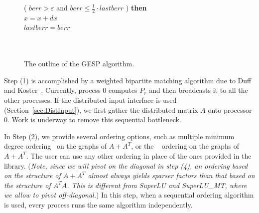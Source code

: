 {\begin{figure}
\begin{tabbing}
\>\>\> ( $berr > \varepsilon$ and 
		   $berr \le \frac{1}{2}\cdot lastberr$ )
	{\bf then} \\
\>\>\>\>\>$x = x + dx$   \\
 \>\>\>\>\>$lastberr = berr$\\
\>\>\>\> \\
\>\>\> \\
\end{tabbing}
\vspace*{-.3in}
\caption{The outline of the GESP algorithm.}
\label{fig:GESP_alg}
\end{figure}
} %

Step (1) is accomplished by a weighted bipartite matching algorithm
due to Duff and Koster~\cite{duffkoster99}. Currently, process 0
computes $P_r$ and then broadcasts it to all the other processes.
If the distributed input interface is used (Section~\ref{sec:DistInput}),
we first gather the distributed matrix $A$  onto processor 0.
Work is underway to remove this sequential bottleneck.

In Step (2), we provide several ordering options, such as 
multiple minimum degree ordering~\cite{liu85} on the graphs of 
$A+A^T$, or the {\metis}~\cite{kaku:98a} ordering on the graphs of $A+A^T$.
The user can use any other ordering in place of the ones provided
in the library.
({\em Note, since we will pivot on the diagonal in step (4),
an ordering based on the structure of $A+A^T$ almost always yields sparser
factors than that based on the structure of $A^TA$.
This is different from SuperLU and SuperLU\_MT, where we allow to pivot
off-diagonal.})
In this step, when a sequential ordering algorithm is used, every process
runs the same algorithm independently.

